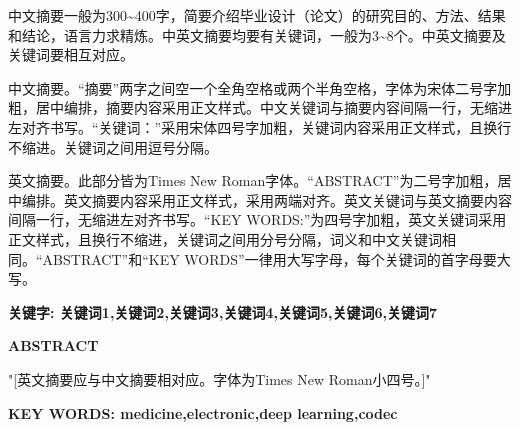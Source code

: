 中文摘要一般为300\textasciitilde400字，简要介绍毕业设计（论文）的研究目的、方法、结果和结论，语言力求精炼。中英文摘要均要有关键词，一般为3\textasciitilde8个。中英文摘要及关键词要相互对应。

中文摘要。“摘要”两字之间空一个全角空格或两个半角空格，字体为宋体二号字加粗，居中编排，摘要内容采用正文样式。中文关键词与摘要内容间隔一行，无缩进左对齐书写。“关键词：”采用宋体四号字加粗，关键词内容采用正文样式，且换行不缩进。关键词之间用逗号分隔。

英文摘要。此部分皆为Times New Roman字体。“ABSTRACT”为二号字加粗，居中编排。英文摘要内容采用正文样式，采用两端对齐。英文关键词与英文摘要内容间隔一行，无缩进左对齐书写。“KEY WORDS:”为四号字加粗，英文关键词采用正文样式，且换行不缩进，关键词之间用分号分隔，词义和中文关键词相同。“ABSTRACT”和“KEY WORDS”一律用大写字母，每个关键词的首字母要大写。

\vspace{1em}
\noindent{}\bfseries 关键字: \normalfont 关键词1,关键词2,关键词3,关键词4,关键词5,关键词6,关键词7
\setcounter{page}{1}

\newpage
\pagestyle{pre}
\begin{center}
    \bfseries ABSTRACT
    \vspace{0.8em}
\end{center}

\fontsize{12pt}{15pt}\selectfont "[英文摘要应与中文摘要相对应。字体为Times New Roman小四号。]"
\vspace{1em}

\fontsize{14pt}{17.5pt}\selectfont\bfseries KEY WORDS: 
\fontsize{12pt}{15pt}\selectfont\normalfont medicine,electronic,deep learning,codec

\newpage
\let\cleardoublepage\relax
{}
\begin{center}
\tableofcontents
\end{center}